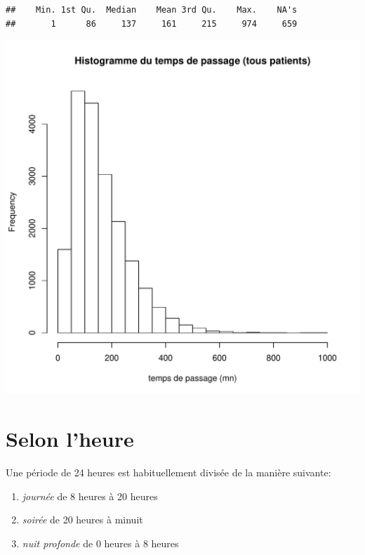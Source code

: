 \documentclass[12pt,english,french,twoside]{report}\usepackage[]{graphicx}\usepackage[]{color}
\makeatletter
\def\maxwidth{ %
  \ifdim\Gin@nat@width>\linewidth
    \linewidth
  \else
    \Gin@nat@width
  \fi
}
\newenvironment{kframe}{%
 \def\at@end@of@kframe{}%
 \ifinner\ifhmode%
  \def\at@end@of@kframe{\end{minipage}}%
  \begin{minipage}{\columnwidth}%
 \fi\fi%
 \def\FrameCommand##1{\hskip\@totalleftmargin \hskip-\fboxsep
 \colorbox{shadecolor}{##1}\hskip-\fboxsep
     \hskip-\linewidth \hskip-\@totalleftmargin \hskip\columnwidth}%
 \MakeFramed {\advance\hsize-\width
   \@totalleftmargin\z@ \linewidth\hsize
   \@setminipage}}%
 {\par\unskip\endMakeFramed%
 \at@end@of@kframe}
\newenvironment{knitrout}{}{} %
\makeatother
\begin{document}
\begin{knitrout}
\color{fgcolor}\begin{kframe}


{\ttfamily\noindent\color{warningcolor}{\#\# Warning: All formats failed to parse. No formats found.}}\begin{verbatim}
##    Min. 1st Qu.  Median    Mean 3rd Qu.    Max.    NA's 
##       1      86     137     161     215     974     659
\end{verbatim}
\end{kframe}
\includegraphics[width=\maxwidth]{figure/passage} 

\end{knitrout}



\section*{Selon l'heure}

Une période de 24 heures est habituellement divisée de la manière suivante:
\begin{enumerate}
  \item \emph{journée} de 8 heures à 20 heures
  \item \emph{soirée} de 20 heures à minuit
  \item  \emph{nuit profonde} de 0 heures à 8 heures
\end{enumerate}
\end{document}
